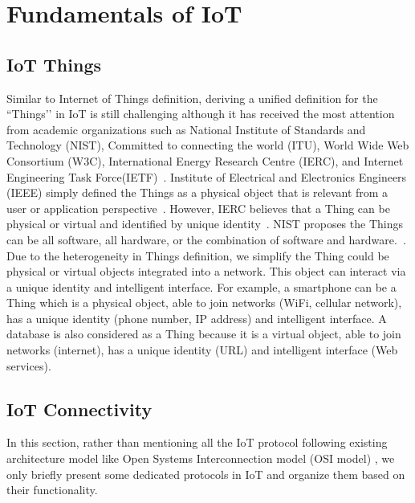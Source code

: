 
\section{Fundamentals of IoT}

\subsection{IoT Things}

Similar to Internet of Things definition, deriving a unified definition for the ``Things’’ in IoT is still challenging although it has received the most attention from academic organizations such as National Institute of Standards and Technology (NIST), Committed to connecting the world (ITU), World Wide Web Consortium (W3C), International Energy Research Centre (IERC), and Internet Engineering Task Force(IETF)~\cite{Liu2016}. Institute of Electrical and Electronics Engineers (IEEE) simply defined the Things as a physical object that is relevant from a user or application perspective~\cite{minerva2015towards}. However, IERC believes that a Thing can be physical or virtual and identified by unique identity~\cite{smith2012internet}. NIST proposes the Things can be all software, all hardware, or the combination of software and hardware.~\cite{voas2016networks}. \\

Due to the heterogeneity in Things definition, we simplify the Thing could be physical or virtual objects integrated into a network. This object can interact via a unique identity and intelligent interface. For example, a smartphone can be a Thing which is a physical object, able to join networks (WiFi, cellular network), has a unique identity (phone number, IP address) and intelligent interface. A database is also considered as a Thing because it is a virtual object, able to join networks (internet), has a unique identity (URL) and intelligent interface (Web services).

\subsection{IoT Connectivity}

In this section, rather than mentioning all the IoT protocol following existing architecture model like  Open Systems Interconnection model (OSI model) , we only briefly present some dedicated protocols in IoT and organize them based on their functionality.


